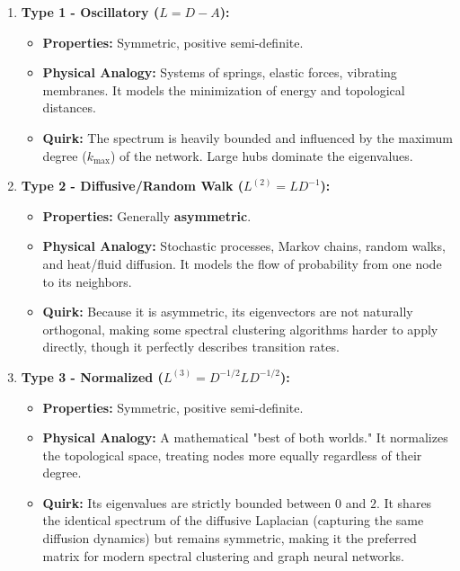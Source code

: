 \begin{enumerate}
    \item \textbf{Type 1 - Oscillatory (\( L = D - A \)):}
          \begin{itemize}
              \item \textbf{Properties:} Symmetric, positive semi-definite.
              \item \textbf{Physical Analogy:} Systems of springs, elastic forces, vibrating membranes. It models the minimization of energy and topological distances.
              \item \textbf{Quirk:} The spectrum is heavily bounded and influenced by the maximum degree (\( k_{\text{max}} \)) of the network. Large hubs dominate the eigenvalues.
          \end{itemize}

    \item \textbf{Type 2 - Diffusive/Random Walk (\( L^{(2)} = L D^{-1} \)):}
          \begin{itemize}
              \item \textbf{Properties:} Generally \textbf{asymmetric}.
              \item \textbf{Physical Analogy:} Stochastic processes, Markov chains, random walks, and heat/fluid diffusion. It models the flow of probability from one node to its neighbors.
              \item \textbf{Quirk:} Because it is asymmetric, its eigenvectors are not naturally orthogonal, making some spectral clustering algorithms harder to apply directly, though it perfectly describes transition rates.
          \end{itemize}

    \item \textbf{Type 3 - Normalized (\( L^{(3)} = D^{-1/2} L D^{-1/2} \)):}
          \begin{itemize}
              \item \textbf{Properties:} Symmetric, positive semi-definite.
              \item \textbf{Physical Analogy:} A mathematical "best of both worlds." It normalizes the topological space, treating nodes more equally regardless of their degree.
              \item \textbf{Quirk:} Its eigenvalues are strictly bounded between \( 0 \) and \( 2 \). It shares the identical spectrum of the diffusive Laplacian (capturing the same diffusion dynamics) but remains symmetric, making it the preferred matrix for modern spectral clustering and graph neural networks.
          \end{itemize}
\end{enumerate}
